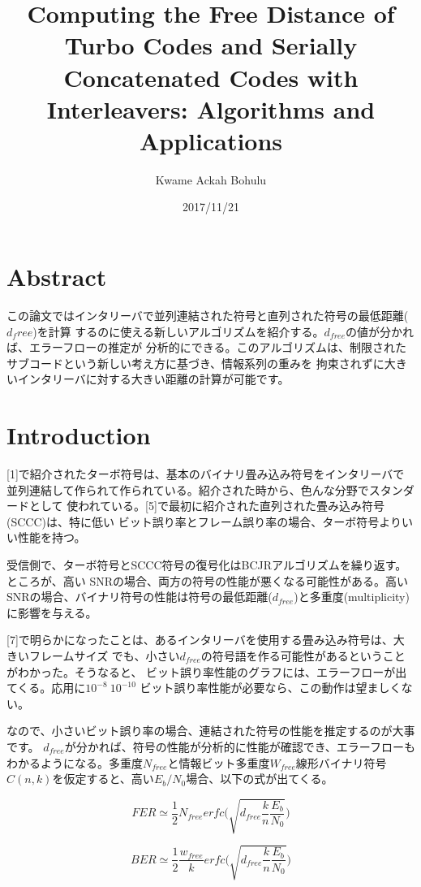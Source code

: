\documentclass[20 pts]{article}
\title{Computing the Free Distance of Turbo Codes and Serially Concatenated Codes
 with Interleavers: Algorithms and Applications}
\author{Kwame Ackah Bohulu}
\date{2017/11/21}
\begin{document}
\maketitle

\newpage

\section{Abstract}
この論文ではインタリーバで並列連結された符号と直列された符号の最低距離($d_free$)を計算
するのに使える新しいアルゴリズムを紹介する。$d_{free}$の値が分かれば、エラーフローの推定が
分析的にできる。このアルゴリズムは、制限されたサブコードという新しい考え方に基づき、情報系列の重みを
拘束されずに大きいインタリーバに対する大きい距離の計算が可能です。


\section{Introduction}
[1]で紹介されたターボ符号は、基本のバイナリ畳み込み符号をインタリーバで
並列連結して作られて作られている。紹介された時から、色んな分野でスタンダードとして
使われている。[5]で最初に紹介された直列された畳み込み符号(SCCC)は、特に低い
ビット誤り率とフレーム誤り率の場合、ターボ符号よりいい性能を持つ。

受信側で、ターボ符号とSCCC符号の復号化はBCJRアルゴリズムを繰り返す。ところが、高い
SNRの場合、両方の符号の性能が悪くなる可能性がある。高い
SNRの場合、バイナリ符号の性能は符号の最低距離($d_{free}$)と多重度(multiplicity)
に影響を与える。

[7]で明らかになったことは、あるインタリーバを使用する畳み込み符号は、大きいフレームサイズ
でも、小さい$d_{free}$の符号語を作る可能性があるということがわかった。そうなると、
ビット誤り率性能のグラフには、エラーフローが出てくる。応用に$10^{-8} ~ 10^{-10}$
ビット誤り率性能が必要なら、この動作は望ましくない。

なので、小さいビット誤り率の場合、連結された符号の性能を推定するのが大事です。
$d_{free}$が分かれば、符号の性能が分析的に性能が確認でき、エラーフローも
わかるようになる。多重度$N_{free}$と情報ビット多重度$W_{free}$線形バイナリ符号
$C(n,k)$を仮定すると、高い$E_b/N_0$場合、以下の式が出てくる。

\begin{equation}
FER \simeq \frac{1}{2}N_{free}erfc\Big ( \sqrt{d_{free}\frac{k}{n}\frac{E_b}{N_0}}\Big)
\label{one}
\end{equation}

\begin{equation}
BER \simeq \frac{1}{2} \frac{w_{free}}{k}erfc\Big ( \sqrt{d_{free}\frac{k}{n}\frac{E_b}{N_0}}\Big)
\label{two}
\end{equation}
\end{document}
